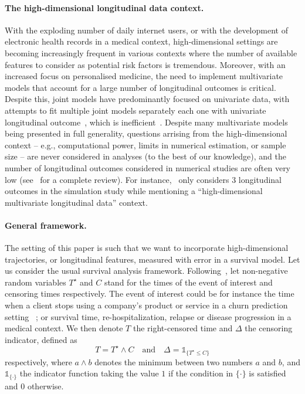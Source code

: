 \documentclass[11pt]{article}
\newcommand{\ind}[1]{\mathds{1}_{#1}}
\begin{document}
\paragraph{The high-dimensional longitudinal data context.}
With the exploding number of daily internet users, or with the development of electronic health records in a medical context, high-dimensional settings are becoming increasingly frequent in various contexts where the number of available features to consider as potential risk factors is tremendous.
Moreover, with an increased focus on personalised medicine, the need to implement multivariate models that account for a large number of longitudinal outcomes is critical. Despite this, joint models have predominantly focused on univariate data, with attempts to fit multiple joint models separately each one with univariate longitudinal outcome~\citep{wang2012joint}, which is inefficient~\citep{lin2002maximum}. 
Despite many multivariate models being presented in full generality, questions arrising from the high-dimensional context -- e.g., computational power, limits in numerical estimation, or sample size -- are never considered in analyses (to the best of our knowledge), and the number of longitudinal outcomes considered in numerical studies are often very low (see~\citet{hickey2016joint} for a complete review). For instance,~\citet{jaffa2014joint} only considers 3 longitudinal outcomes in the simulation study while mentioning a ``high-dimensional multivariate longitudinal data'' context.


\paragraph{General framework.}

The setting of this paper is such that we want to incorporate high-dimensional trajectories, or longitudinal features, measured with error in a survival model. Let us consider the usual survival analysis framework.
Following~\citet{andersen2012statistical}, let non-negative random variables $T^\star$ and $C$ stand for the times of the event of interest and censoring times respectively. The event of interest could be for instance the time when a client stops using a company's product or service in a churn prediction setting~ ; or survival time, re-hospitalization, relapse or disease progression in a medical context.
We then denote $T$ the right-censored time and $\Delta$ the censoring indicator, defined as 
\begin{equation*}
T = T^\star \wedge C \quad \text{and} \quad \Delta = \ind{\{T^\star \leq C\}}
\end{equation*}
respectively, where $a \wedge b$ denotes the minimum between two numbers $a$ and $b$, and $\ind{\{\cdot\}}$ the indicator function taking the value $1$ if the condition in $\{\cdot\}$ is satisfied and $0$ otherwise.
\end{document}
